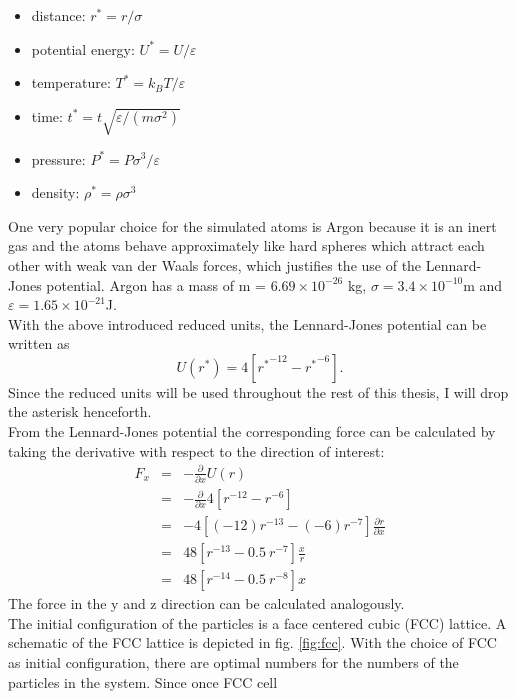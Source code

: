 \documentclass[12pt]{article}
\begin{document}
\begin{itemize}
    \item {distance:} $r^* = r/\sigma$
    \item {potential energy:} $U^* = U/\varepsilon$
    \item {temperature:} $T^* = k_B T/\varepsilon$
    \item {time:} $t^* = t\sqrt{\varepsilon/(m\sigma^2)}$
    \item {pressure:} $P^* = P\sigma^3/\varepsilon$
    \item {density:} $\rho^* = \rho \sigma^3$
\end{itemize}
One very popular choice for the simulated atoms is Argon because it is an inert gas and the atoms behave 
approximately like hard spheres which attract each other with weak van der Waals forces, which justifies the use of the Lennard-Jones potential. 
Argon has a mass of m = $6.69 \times 10^{-26}$ kg, $\sigma = 3.4 \times 10^{-10}$m and $\varepsilon = 1.65 \times 10^{-21}$J.\\
With the above introduced reduced units, the Lennard-Jones potential can be written as
\begin{equation}
    U(r^*) = 4\left[{r^*}^{-12} - {r^*}^{-6}\right].
\end{equation}
Since the reduced units will be used throughout the rest of this thesis, I will drop the asterisk henceforth.\\
From the Lennard-Jones potential the corresponding force can be calculated by taking the derivative with respect to the direction of interest:
\begin{eqnarray}
    F_{x} &=& -\frac{\partial}{\partial x} U(r) \nonumber\\
                &=& -\frac{\partial}{\partial x} 4\left[{r}^{-12} - {r}^{-6}\right] \nonumber\\
                &=& -4 \left[(-12){r}^{-13} - (-6){r}^{-7}\right] \frac{\partial r}{\partial x} \nonumber\\
                &=& 48 \left[r^{-13} - 0.5 \ r^{-7}\right] \frac{x}{r} \nonumber\\
    \label{eq:ljforce} &=& 48 \left[r^{-14} - 0.5 \ r^{-8}\right] x
\end{eqnarray}
The force in the y and z direction can be calculated analogously.\\
The initial configuration of the particles is a face centered cubic (FCC) lattice. A schematic of the FCC lattice is depicted in fig. \ref{fig:fcc}.
With the choice of FCC as initial configuration, there are optimal numbers for the numbers of the particles in the system. Since once FCC cell 
\end{document}
